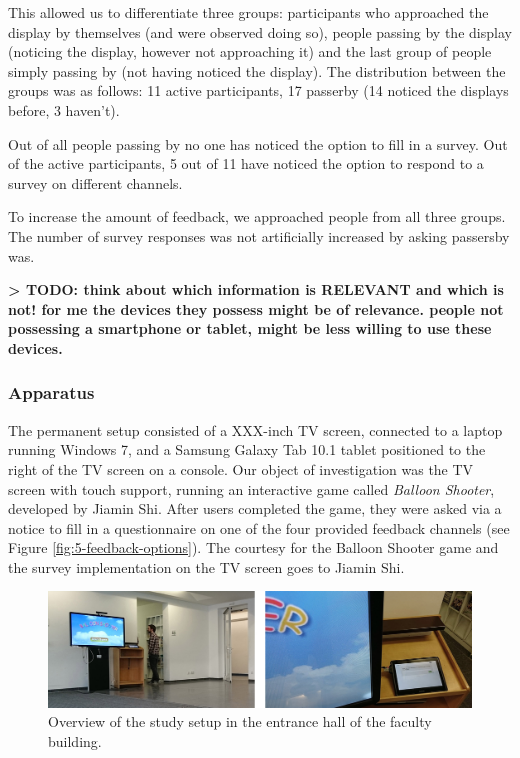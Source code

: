 		This allowed us to differentiate three groups: participants who approached the display by themselves (and were observed doing so), people passing by the display (noticing the display, however not approaching it) and the last group of people simply passing by (not having noticed the display). The distribution between the groups was as follows: 11 active participants, 17 passerby (14 noticed the displays before, 3 haven't). 

		Out of all people passing by no one has noticed the option to fill in a survey. Out of the active participants, 5 out of 11 have noticed the option to respond to a survey on different channels.

		To increase the amount of feedback, we approached people from all three groups. The number of survey responses was not artificially increased by asking passersby was.


		\textbf{> TODO: think about which information is RELEVANT and which is not! for me the devices they possess might be of relevance. people not possessing a smartphone or tablet, might be less willing to use these devices.} 
		



	\subsubsection{Apparatus}
	\label{chapter:field-study:apparatus}

		The permanent setup consisted of a XXX-inch TV screen, connected to a laptop running Windows 7, and a Samsung Galaxy Tab 10.1 tablet positioned to the right of the TV screen on a console. Our object of investigation was the TV screen with touch support, running an interactive game called \textit{Balloon Shooter}, developed by Jiamin Shi. After users completed the game, they were asked via a notice to fill in a questionnaire on one of the four provided feedback channels (see Figure \ref{fig:5-feedback-options}). The courtesy for the Balloon Shooter game and the survey implementation on the TV screen goes to Jiamin Shi.

		\begin{figure}
		    \begin{center}
   \includegraphics[width=\columnwidth]{img/5_field-study/study-setup.jpg}
		    \end{center}
		 \caption{Overview of the study setup in the entrance hall of the faculty building.}
		 \label{fig:5-study-setup}
		\end{figure}

